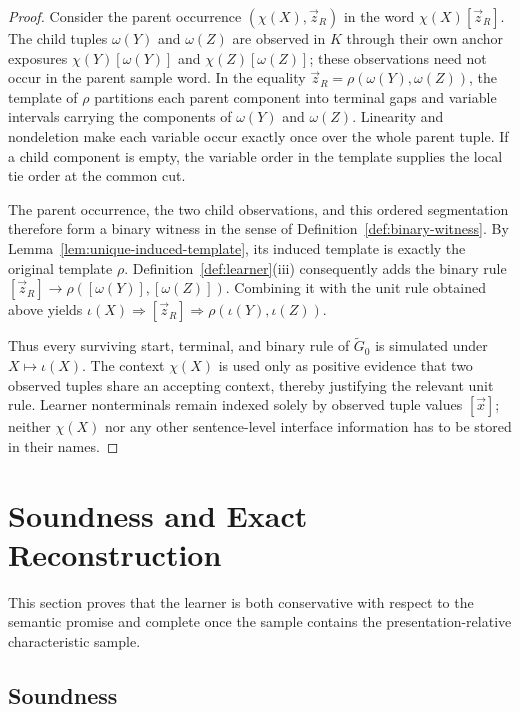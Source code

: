 \documentclass[11pt,a4paper]{article}
\theoremstyle{remark}
\newcommand{\tuple}[1]{\vec{#1}}
\begin{document}
\begin{proof}
Consider the parent occurrence \((\chi(X),\tuple z_R)\) in the word
\(\chi(X)[\tuple z_R]\).  The child tuples \(\omega(Y)\) and \(\omega(Z)\)
are observed in \(K\) through their own anchor exposures
\(\chi(Y)[\omega(Y)]\) and \(\chi(Z)[\omega(Z)]\); these observations need
not occur in the parent sample word.  In the equality
\(\tuple z_R=\rho(\omega(Y),\omega(Z))\), the template of \(\rho\) partitions
each parent component into terminal gaps and variable intervals carrying the
components of \(\omega(Y)\) and \(\omega(Z)\).  Linearity and nondeletion make
each variable occur exactly once over the whole parent tuple.  If a child
component is empty, the variable order in the template supplies the local tie
order at the common cut.

The parent occurrence, the two child observations, and this ordered
segmentation therefore form a binary witness in the sense of
Definition~\ref{def:binary-witness}.  By
Lemma~\ref{lem:unique-induced-template}, its induced template is exactly the
original template \(\rho\).  Definition~\ref{def:learner}(iii) consequently
adds the binary rule
\([\tuple z_R]\to\rho([\omega(Y)],[\omega(Z)])\).  Combining it with the unit
rule obtained above yields
\(\iota(X)\Rightarrow[\tuple z_R]\Rightarrow
\rho(\iota(Y),\iota(Z))\).

Thus every surviving start, terminal, and binary rule of \(\widetilde G_0\) is
simulated under \(X\mapsto\iota(X)\).  The context \(\chi(X)\) is used only as
positive evidence that two observed tuples share an accepting context, thereby
justifying the relevant unit rule.  Learner nonterminals remain indexed solely
by observed tuple values \([\tuple x]\); neither \(\chi(X)\) nor any other
sentence-level interface information has to be stored in their names.
\end{proof}

\section{Soundness and Exact Reconstruction}
\label{sec:exact}

This section proves that the learner is both conservative with respect to the
semantic promise and complete once the sample contains the presentation-relative
characteristic sample.

\subsection{Soundness}
\label{sec:soundness}
\end{document}
